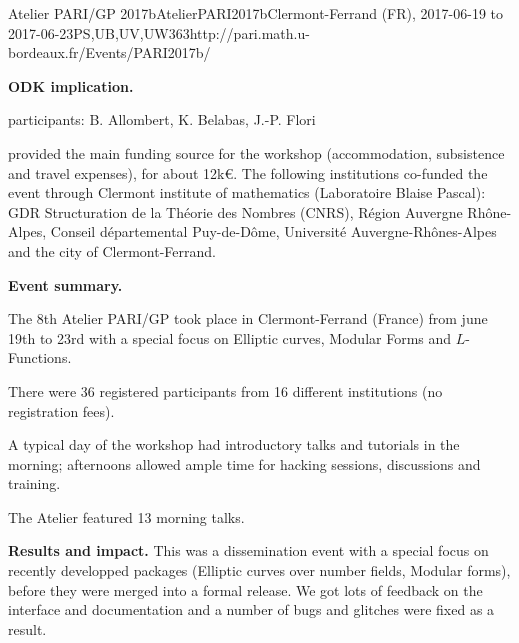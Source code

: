 \begin{event}{Atelier PARI/GP 2017b}{AtelierPARI2017b}{Clermont-Ferrand (FR),
2017-06-19 to 2017-06-23}{PS,UB,UV,UW}{36}{3}{http://pari.math.u-bordeaux.fr/Events/PARI2017b/}


\textbf{ODK implication.} 

\ODK participants: B. Allombert, K. Belabas, J.-P. Flori

\ODK provided the main funding source for the workshop (accommodation,
subsistence and travel expenses), for about 12k\euro. The following
institutions co-funded the event through Clermont institute of mathematics
  (Laboratoire
  Blaise Pascal): GDR Structuration de la Théorie des Nombres (CNRS), Région
  Auvergne Rhône-Alpes, Conseil départemental Puy-de-Dôme, Université
  Auvergne-Rhônes-Alpes and the city of Clermont-Ferrand.

\textbf{Event summary.} 

The 8th Atelier PARI/GP took place in Clermont-Ferrand (France) from june
19th to 23rd with a special focus on Elliptic curves, Modular Forms and
$L$-Functions.

There were 36 registered participants from 16 different institutions
(no registration fees).

A typical day of the workshop had introductory talks and tutorials
in the morning; afternoons allowed ample time for hacking sessions,
discussions and training.

The Atelier featured 13 morning talks.

\textbf{Results and impact.} 
This was a dissemination event with a special focus on recently developped
packages (Elliptic curves over number fields, Modular forms), before they were
merged into a formal release. We got lots of feedback on the interface and
documentation and a number of bugs and glitches were fixed as a result.
\end{event}
